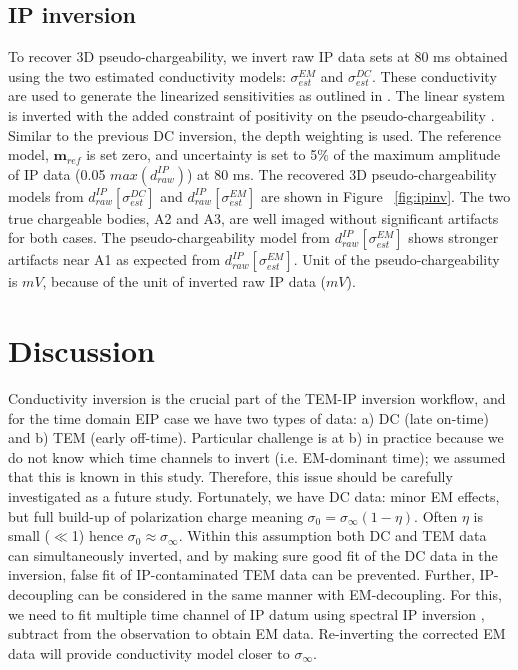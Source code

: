 \documentclass[paper]{geophysics}
\newcommand{\siginf}{\sigma_\infty}
\newcommand{\dip}{d^{IP}}
\begin{document}
\subsection{IP inversion}
To recover 3D pseudo-chargeability, we invert raw IP data sets at 80 ms obtained using the two estimated conductivity models: $\sigma^{EM}_{est}$ and $\sigma^{DC}_{est}$. These conductivity are used to generate the linearized sensitivities as outlined in \cite{Kang2016}. The linear system is inverted with the added constraint of positivity on the pseudo-chargeability \cite[]{doug1994}. Similar to the previous DC inversion, the depth weighting is used. The reference model, $\mathbf{m}_{ref}$ is set zero, and uncertainty is set to 5$\%$ of the maximum amplitude of IP data (0.05 $max(\dip_{raw})$) at 80 ms. The recovered 3D pseudo-chargeability models from $\dip_{raw}[\sigma^{DC}_{est}]$ and $\dip_{raw}[\sigma^{EM}_{est}]$ are shown in Figure ~\ref{fig:ipinv}. The two true chargeable bodies, A2 and A3, are well imaged without significant artifacts for both cases. The pseudo-chargeability model from $\dip_{raw}[\sigma^{EM}_{est}]$ shows stronger artifacts near A1 as expected from $\dip_{raw}[\sigma^{EM}_{est}]$. Unit of the pseudo-chargeability is $mV$, because of the unit of inverted raw IP data ($mV$).

\section{Discussion}
Conductivity inversion is the crucial part of the TEM-IP inversion workflow, and for the time domain EIP case we have two types of data: a) DC (late on-time) and b) TEM (early off-time). Particular challenge is at b) in practice because we do not know which time channels to invert (i.e. EM-dominant time); we assumed that this is known in this study. Therefore, this issue should be carefully investigated as a future study. Fortunately, we have DC data: minor EM effects, but full build-up of polarization charge meaning $\sigma_0=\siginf(1-\eta)$. Often $\eta$ is small ($\ll$1) hence $\sigma_0\approx \siginf$. Within this assumption both DC and TEM data can simultaneously inverted, and by making sure good fit of the DC data in the inversion, false fit of IP-contaminated TEM data can be prevented. Further, IP-decoupling can be considered in the same manner with EM-decoupling. For this, we need to fit multiple time channel of IP datum using spectral IP inversion \cite[]{Yuval1997,Fiandaca2012}, subtract from the observation to obtain EM data. Re-inverting the corrected EM data will provide conductivity model closer to $\siginf$.
\end{document}
